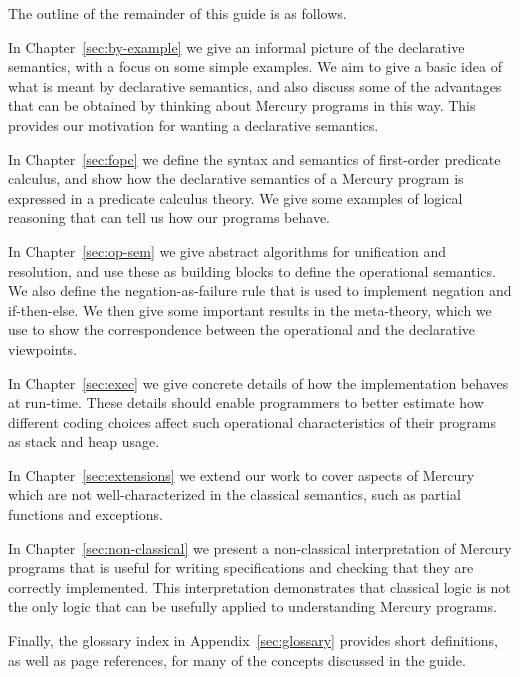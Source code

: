 The outline of the remainder of this guide is as follows.

In Chapter~\ref{sec:by-example} we give
an informal picture of the declarative semantics,
with a focus on some simple examples.
We aim to give a basic idea of
what is meant by declarative semantics,
and also discuss some of the advantages that can be obtained
by thinking about Mercury programs in this way.
This provides our motivation for
wanting a declarative semantics.

In Chapter~\ref{sec:fopc} we define
the syntax and semantics of first-order predicate calculus,
and show how the declarative semantics of a Mercury program
is expressed in a predicate calculus theory.
We give some examples of logical reasoning
that can tell us how our programs behave.

In Chapter~\ref{sec:op-sem}
we give abstract algorithms for unification and resolution,
and use these as building blocks to define the operational semantics.
We also define the negation-as-failure rule
that is used to implement negation and if-then-else.
We then give some important results in the meta-theory,
which we use to show the correspondence between
the operational and the declarative viewpoints.

In Chapter~\ref{sec:exec}
we give concrete details of how the implementation
behaves at run-time.
These details should enable programmers to better estimate
how different coding choices affect
such operational characteristics of their programs
as stack and heap usage.

In Chapter~\ref{sec:extensions} we extend our work to cover aspects of Mercury
which are not well-characterized in the classical semantics,
such as partial functions and exceptions.

In Chapter~\ref{sec:non-classical} we present
a non-classical interpretation of Mercury programs
that is useful for writing specifications
and checking that they are correctly implemented.
This interpretation demonstrates that
classical logic is not the only logic
that can be usefully applied to understanding Mercury programs.

Finally,
the glossary index in Appendix~\ref{sec:glossary}
provides short definitions,
as well as page references,
for many of the concepts discussed in the guide.
